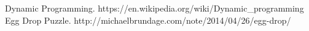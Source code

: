\documentclass[12pt,a4paper,oneside]{report}
\begin{document}

\renewcommand{\bibname}{References}
\begin{thebibliography}{1} 
	 Dynamic Programming. https://en.wikipedia.org/wiki/Dynamic\_programming
	 Egg Drop Puzzle. http://michaelbrundage.com/note/2014/04/26/egg-drop/
\end{thebibliography}

\end{document}
